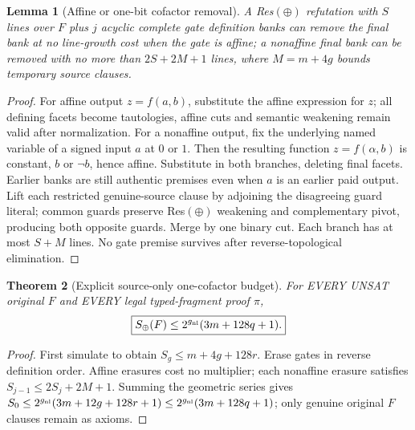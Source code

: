 \documentclass[11pt]{article}
\newtheorem{theorem}{Theorem}
\newtheorem{lemma}[theorem]{Lemma}
\begin{document}
\begin{lemma}[Affine or one-bit cofactor removal]
A Res$(\oplus)$ refutation with $S$ lines over $F$ plus $j$ acyclic complete gate definition banks can remove the final bank at no line-growth cost when the gate is affine; a nonaffine final bank can be removed with no more than $2S+2M+1$ lines, where $M=m+4g$ bounds temporary source clauses.
\end{lemma}
\begin{proof}
For affine output $z=f(a,b)$, substitute the affine expression for $z$; all defining facets become tautologies, affine cuts and semantic weakening remain valid after normalization. For a nonaffine output, fix the underlying named variable of a signed input $a$ at $0$ or $1$. Then the resulting function $z=f(\alpha,b)$ is constant, $b$ or $\neg b$, hence affine. Substitute in both branches, deleting final facets. Earlier banks are still authentic premises even when $a$ is an earlier paid output. Lift each restricted genuine-source clause by adjoining the disagreeing guard literal; common guards preserve Res$(\oplus)$ weakening and complementary pivot, producing both opposite guards. Merge by one binary cut. Each branch has at most $S+M$ lines. No gate premise survives after reverse-topological elimination.
\end{proof}

\begin{theorem}[Explicit source-only one-cofactor budget]
For EVERY UNSAT original $F$ and EVERY legal typed-fragment proof $\pi$,
\[
\boxed{S_\oplus(F)\le 2^{g_{\rm nl}}(3m+128q+1).}
\]
\end{theorem}
\begin{proof}
First simulate to obtain $S_g\le m+4g+128r$. Erase gates in reverse definition order. Affine erasures cost no multiplier; each nonaffine erasure satisfies $S_{j-1}\le2S_j+2M+1$. Summing the geometric series gives $S_0\le2^{g_{\rm nl}}(3m+12g+128r+1)\le2^{g_{\rm nl}}(3m+128q+1)$; only genuine original $F$ clauses remain as axioms.
\end{proof}
\end{document}

